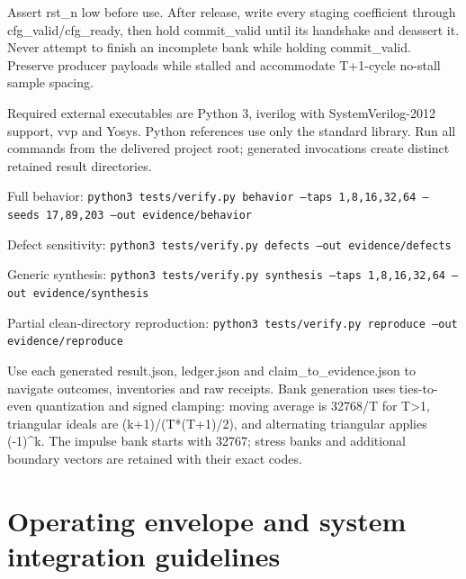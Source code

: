 \documentclass[11pt,a4paper]{article}
\begin{document}
Assert rst\_\allowbreak{}n low before use. After release,\allowbreak{} write every staging coefficient through cfg\_\allowbreak{}valid/\allowbreak{}cfg\_\allowbreak{}ready,\allowbreak{} then hold commit\_\allowbreak{}valid until its handshake and deassert it. Never attempt to finish an incomplete bank while holding commit\_\allowbreak{}valid. Preserve producer payloads while stalled and accommodate T+\allowbreak{}1-cycle no-stall sample spacing.


Required external executables are Python 3,\allowbreak{} iverilog with SystemVerilog-2012 support,\allowbreak{} vvp and Yosys. Python references use only the standard library. Run all commands from the delivered project root; generated invocations create distinct retained result directories.


Full behavior: \texttt{python3 tests/\allowbreak{}verify.py behavior --taps 1,\allowbreak{}8,\allowbreak{}16,\allowbreak{}32,\allowbreak{}64 --seeds 17,\allowbreak{}89,\allowbreak{}203 --out evidence/\allowbreak{}behavior}


Defect sensitivity: \texttt{python3 tests/\allowbreak{}verify.py defects --out evidence/\allowbreak{}defects}


Generic synthesis: \texttt{python3 tests/\allowbreak{}verify.py synthesis --taps 1,\allowbreak{}8,\allowbreak{}16,\allowbreak{}32,\allowbreak{}64 --out evidence/\allowbreak{}synthesis}


Partial clean-directory reproduction: \texttt{python3 tests/\allowbreak{}verify.py reproduce --out evidence/\allowbreak{}reproduce}


Use each generated result.json,\allowbreak{} ledger.json and claim\_\allowbreak{}to\_\allowbreak{}evidence.json to navigate outcomes,\allowbreak{} inventories and raw receipts. Bank generation uses ties-to-even quantization and signed clamping: moving average is 32768/\allowbreak{}T for T>1,\allowbreak{} triangular ideals are (\allowbreak{}k+\allowbreak{}1)\allowbreak{}/\allowbreak{}(\allowbreak{}T*\allowbreak{}(\allowbreak{}T+\allowbreak{}1)\allowbreak{}/\allowbreak{}2)\allowbreak{},\allowbreak{} and alternating triangular applies (\allowbreak{}-1)\allowbreak{}\textasciicircum{}k. The impulse bank starts with 32767; stress banks and additional boundary vectors are retained with their exact codes.


\section{Operating envelope and system integration guidelines}
\end{document}

